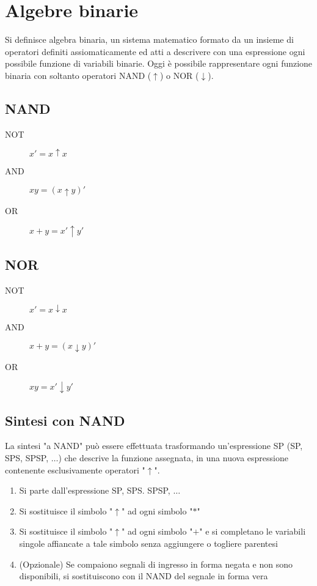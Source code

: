 \documentclass{subfiles}
\begin{document}
\section{Algebre binarie}

Si definisce algebra binaria, un sistema matematico formato da un insieme di operatori definiti assiomaticamente ed atti a descrivere con una espressione ogni possibile funzione di variabili binarie.
Oggi è possibile rappresentare ogni funzione binaria con soltanto operatori NAND ($\uparrow$) o NOR ($\downarrow$).

\subsection{NAND}

\begin{description}
    \item[NOT] $x' = x \uparrow x$
    \item[AND] $xy = (x \uparrow y)'$
    \item[OR] $x+y = x' \uparrow y'$
\end{description}

\subsection{NOR}

\begin{description}
    \item[NOT] $x' = x \downarrow x$
    \item[AND] $x + y = (x \downarrow y)'$
    \item[OR] $xy = x' \downarrow y'$
\end{description}

\subsection{Sintesi con NAND}

La sintesi "a NAND" può essere effettuata trasformando un'espressione SP (SP, SPS, SPSP, $\dots$) che descrive la funzione assegnata, in una nuova espressione contenente esclusivamente operatori "$\uparrow$".

\begin{enumerate}
    \item Si parte dall'espressione SP, SPS. SPSP, $\dots$
    \item Si sostituisce il simbolo "$\uparrow$" ad ogni simbolo "$*$"
    \item Si sostituisce il simbolo "$\uparrow$" ad ogni simbolo "$+$" e si completano le variabili singole affiancate a tale simbolo senza aggiungere o togliere parentesi
    \item (Opzionale) Se compaiono segnali di ingresso in forma negata e non sono disponibili, si sostituiscono con il NAND del segnale in forma vera
\end{enumerate}
\end{document}
